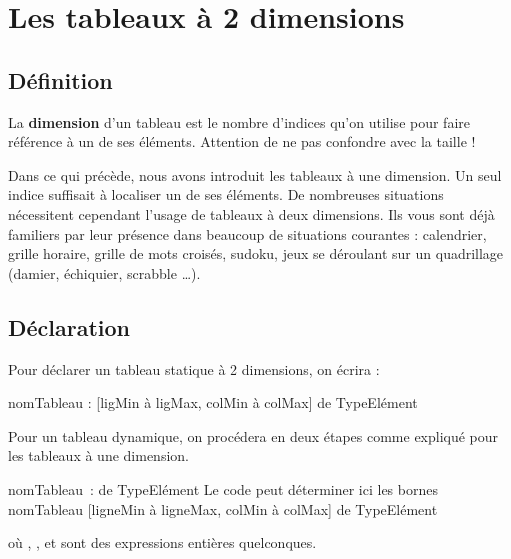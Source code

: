 \chapter{Les tableaux à 2 dimensions}

\section{Définition}

	La \textbf{dimension} d’un tableau est le nombre d’indices qu’on utilise
	pour faire référence à un de ses éléments. Attention de ne pas confondre 
	avec la	taille !
	
	Dans ce qui précède, nous avons introduit les tableaux à une dimension.
	Un seul indice suffisait à localiser un de ses éléments. De nombreuses
	situations nécessitent cependant l’usage de tableaux à deux dimensions.
	Ils vous sont déjà familiers par leur présence dans beaucoup de
	situations courantes : calendrier, grille horaire, grille de mots
	croisés, sudoku, jeux se déroulant sur un quadrillage (damier,
	échiquier, scrabble \dots).

\section{Déclaration}

	Pour déclarer un tableau statique à 2 dimensions, on écrira :

	\begin{Pseudocode}
	\Decl nomTableau :  [ligMin à ligMax, colMin à colMax] de TypeElément
	\end{Pseudocode}
	
	Pour un tableau dynamique, on procédera en deux étapes comme expliqué
	pour les tableaux à une dimension. 
	
	\begin{Pseudocode}
	\Decl nomTableau~:  de TypeElément
	\LComment Le code peut déterminer ici les bornes
	\Let nomTableau \Gets {}  [ligneMin à ligneMax, colMin à colMax] de TypeElément
	\end{Pseudocode}

	où , , 
	 et sont des
	expressions entières quelconques.

